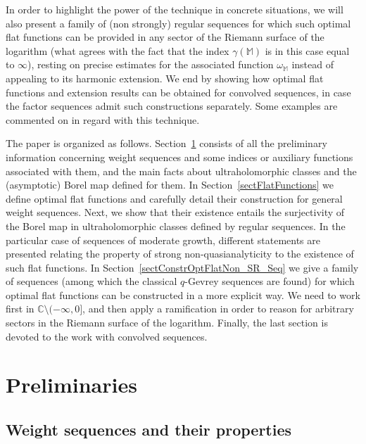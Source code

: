 \documentclass[11pt,a4paper]{article}
\theoremstyle{plain}
\theoremstyle{definition}
\newcommand{\C}{\mathbb{C}}
\newcommand{\M}{\mathbb{M}}
\begin{document}
In order to highlight the power of the technique in concrete situations, we will also present a family of (non strongly) regular sequences for which such optimal flat functions can be provided in any sector of the Riemann surface of the logarithm (what agrees with the fact that the index $\gamma(\M)$ is in this case equal to $\infty$), resting on precise estimates for the associated function $\omega_{\M}$ instead of appealing to its harmonic extension.
We end by showing how optimal flat functions and extension results can be obtained for convolved sequences, in case the factor sequences admit such constructions separately. Some examples are commented on in regard with this technique.


The paper is organized as follows. Section~\ref{sectPrelimin} consists of all the preliminary information concerning weight sequences and some indices or auxiliary functions associated with them, and the main facts about ultraholomorphic classes and the (asymptotic) Borel map defined for them. In Section~\ref{sectFlatFunctions} we define optimal flat functions and carefully detail their construction for general weight sequences. Next, we show that their existence entails the
surjectivity of the Borel map in ultraholomorphic classes defined by regular sequences. In the particular case of sequences of moderate growth, different statements are presented relating the property of strong non-quasianalyticity to the existence of such flat functions. In Section~\ref{sectConstrOptFlatNon_SR_Seq} we give a family of sequences (among which the classical $q$-Gevrey sequences are found) for which optimal flat functions can be constructed in a more explicit way.
We need to work first in $\C\setminus(-\infty,0]$, and then apply a ramification in order to reason for arbitrary sectors in the Riemann surface of the logarithm.
Finally, the last section is devoted to the work with convolved sequences.


\section{Preliminaries}\label{sectPrelimin}

\subsection{Weight sequences and their properties}\label{subsectstrregseq}
\end{document}
